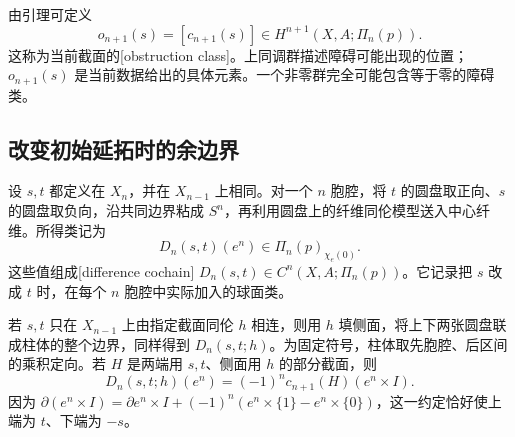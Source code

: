 由引理可定义
\begin{equation}\label{g2:eq:obstruction-class}
	o_{n+1}(s)=[c_{n+1}(s)]\in H^{n+1}(X,A;\Pi_n(p)).
\end{equation}
这称为当前截面的[obstruction class]。上同调群描述障碍可能出现的位置；\(o_{n+1}(s)\) 是当前数据给出的具体元素。一个非零群完全可能包含等于零的障碍类。

\subsection{改变初始延拓时的余边界}
\label{g2:subsec:1202:03}

设 \(s,t\) 都定义在 \(X_n\)，并在 \(X_{n-1}\) 上相同。对一个 \(n\) 胞腔，将 \(t\) 的圆盘取正向、\(s\) 的圆盘取负向，沿共同边界粘成 \(S^n\)，再利用圆盘上的纤维同伦模型送入中心纤维。所得类记为
\[
	D_n(s,t)(e^n)\in\Pi_n(p)_{\chi_e(0)}.
\]
这些值组成[difference cochain] \(D_n(s,t)\in C^n(X,A;\Pi_n(p))\)。它记录把 \(s\) 改成 \(t\) 时，在每个 \(n\) 胞腔中实际加入的球面类。

\ProseParagraphBreak

若 \(s,t\) 只在 \(X_{n-1}\) 上由指定截面同伦 \(h\) 相连，则用 \(h\) 填侧面，将上下两张圆盘联成柱体的整个边界，同样得到 \(D_n(s,t;h)\)。为固定符号，柱体取先胞腔、后区间的乘积定向。若 \(H\) 是两端用 \(s,t\)、侧面用 \(h\) 的部分截面，则
\begin{equation}\label{g2:eq:difference-prism-sign}
	D_n(s,t;h)(e^n)=(-1)^n c_{n+1}(H)(e^n\times I).
\end{equation}
因为 \(\partial(e^n\times I)=\partial e^n\times I+(-1)^n(e^n\times\{1\}-e^n\times\{0\})\)，这一约定恰好使上端为 \(t\)、下端为 \(-s\)。

